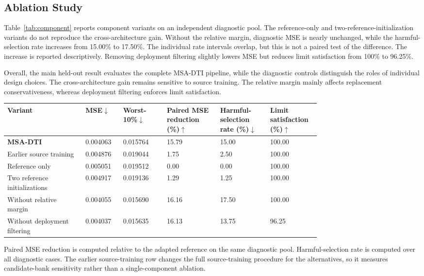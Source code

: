 \documentclass[a4paper,fleqn]{cas-sc}
\begin{document}
\subsection{Ablation Study}
\label{subsec:component}

Table~\ref{tab:component} reports component variants on an independent
diagnostic pool. The reference-only and two-reference-initialization variants
do not reproduce the cross-architecture gain. Without the relative margin,
diagnostic MSE is nearly unchanged, while the harmful-selection rate increases
from 15.00\% to 17.50\%. The individual rate intervals overlap, but this is
not a paired test of the difference. The increase is reported descriptively. Removing deployment
filtering slightly lowers MSE but reduces limit satisfaction from 100\% to
96.25\%.

Overall, the main held-out result evaluates the complete MSA-DTI pipeline,
while the diagnostic controls distinguish the roles of individual design
choices. The cross-architecture gain remains sensitive to source training. The
relative margin mainly affects replacement conservativeness, whereas
deployment filtering enforces limit satisfaction.

\begin{center}
\begin{minipage}{\linewidth}
\label{tab:component}
\centering
\scriptsize
\renewcommand{\arraystretch}{1.08}
\setlength{\tabcolsep}{2.2pt}
\begin{tabularx}{\linewidth}
{Y Z{0.12\linewidth} Z{0.14\linewidth} Z{0.17\linewidth} Z{0.16\linewidth} Z{0.16\linewidth}}
\toprule
Variant
& MSE$\downarrow$
& Worst-10\%$\downarrow$
& Paired MSE reduction (\%)$\uparrow$
& Harmful-selection rate (\%)$\downarrow$
& Limit satisfaction (\%)$\uparrow$ \\
\midrule
\textbf{MSA-DTI} & 0.004063 & 0.015764 & 15.79 & 15.00 & 100.00 \\
Earlier source training & 0.004876 & 0.019044 & 1.75 & 2.50 & 100.00 \\
Reference only & 0.005051 & 0.019512 & 0.00 & 0.00 & 100.00 \\
Two reference initializations & 0.004917 & 0.019136 & 1.29 & 1.25 & 100.00 \\
Without relative margin & 0.004055 & 0.015690 & 16.16 & 17.50 & 100.00 \\
Without deployment filtering & 0.004037 & 0.015635 & 16.13 & 13.75 & 96.25 \\
\bottomrule
\end{tabularx}
\vspace{2pt}
\par\footnotesize
Paired MSE reduction is computed relative to the adapted reference on the same
diagnostic pool. Harmful-selection rate is computed over all diagnostic
cases. The earlier source-training row changes the full source-training
procedure for the alternatives, so it measures candidate-bank sensitivity
rather than a single-component ablation.
\end{minipage}
\end{center}
\end{document}

